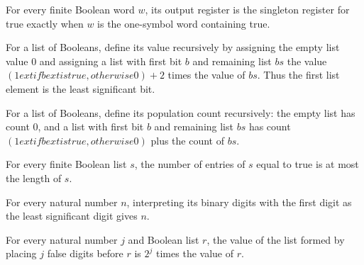 \begin{lemma}
\label{Complexity.TimeHierarchy.OutReg.ofList_eq_one_true}
\leanok
{}
For every finite Boolean word $w$, its output register is the singleton register for
true exactly when $w$ is the one-symbol word containing true.
\end{lemma}

\begin{definition}
\label{Complexity.TimeHierarchy.ctrVal}
\leanok
For a list of Booleans, define its value recursively by assigning the empty list value
$0$ and assigning a list with first bit $b$ and remaining list $bs$ the value $(1	ext{
if }b	ext{ is true, otherwise }0)+2$ times the value of $bs$. Thus the first list
element is the least significant bit.
\end{definition}

\begin{definition}
\label{Complexity.TimeHierarchy.ctrPop}
\leanok
For a list of Booleans, define its population count recursively: the empty list has
count $0$, and a list with first bit $b$ and remaining list $bs$ has count $(1	ext{ if
}b	ext{ is true, otherwise }0)$ plus the count of $bs$.
\end{definition}

\begin{lemma}
\label{Complexity.TimeHierarchy.ctrPop_le_length}
\leanok
{}
For every finite Boolean list $s$, the number of entries of $s$ equal to true is at most
the length of $s$.
\end{lemma}

\begin{lemma}
\label{Complexity.TimeHierarchy.ctrVal_bits}
\leanok
{}
For every natural number $n$, interpreting its binary digits with the first digit as the
least significant digit gives $n$.
\end{lemma}

\begin{lemma}
\label{Complexity.TimeHierarchy.ctrVal_replicate_false}
\leanok
{}
For every natural number $j$ and Boolean list $r$, the value of the list formed by
placing $j$ false digits before $r$ is $2^j$ times the value of $r$.
\end{lemma}


